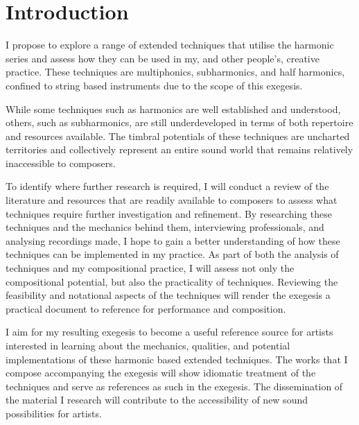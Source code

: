 \section{Introduction}
I propose to explore a range of extended techniques that utilise the harmonic series and assess how they can be used in my, and other people's, creative practice. 
These techniques are multiphonics, subharmonics, and half harmonics, confined to string based instruments due to the scope of this exegesis.

While some techniques such as harmonics are well established and understood, others, such as subharmonics, are still underdeveloped in terms of both repertoire and resources available. 
The timbral potentials of these techniques are uncharted territories and collectively represent an entire sound world that remains relatively inaccessible to composers.

To identify where further research is required, I will conduct a review of the literature and resources that are readily available to composers to assess what techniques require further investigation and refinement. 
By researching these techniques and the mechanics behind them, interviewing professionals, and analysing recordings made, I hope to gain a better understanding of how these techniques can be implemented in my practice. 
As part of both the analysis of techniques and my compositional practice, I will assess not only the compositional potential, but also the practicality of techniques. 
Reviewing the feasibility and notational aspects of the techniques will render the exegesis a practical document to reference for performance and composition.

I aim for my resulting exegesis to become a useful reference source for artists interested in learning about the mechanics, qualities, and potential implementations of these harmonic based extended techniques. 
The works that I compose accompanying the exegesis will show idiomatic treatment of the techniques and serve as references as such in the exegesis. 
The dissemination of the material I research will contribute to the accessibility of new sound possibilities for artists.